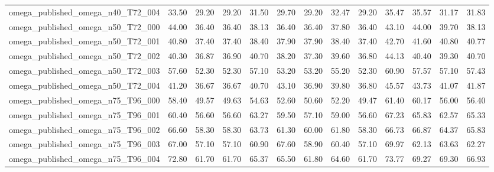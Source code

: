 \begin{table}[htbp]
\begin{tabular}{lrrrrrrrrrrrr}
omega\_published\_omega\_n40\_T72\_004 & 33.50 & 29.20 & 29.20 & 31.50 & 29.70 & 29.20 & 32.47 & 29.20 & 35.47 & 35.57 & 31.17 & 31.83 \\
omega\_published\_omega\_n50\_T72\_000 & 44.00 & 36.40 & 36.40 & 38.13 & 36.40 & 36.40 & 37.80 & 36.40 & 43.10 & 44.00 & 39.70 & 38.13 \\
omega\_published\_omega\_n50\_T72\_001 & 40.80 & 37.40 & 37.40 & 38.40 & 37.90 & 37.90 & 38.40 & 37.40 & 42.70 & 41.60 & 40.80 & 40.77 \\
omega\_published\_omega\_n50\_T72\_002 & 40.30 & 36.87 & 36.90 & 40.70 & 38.20 & 37.30 & 39.60 & 36.80 & 44.13 & 40.40 & 39.30 & 40.70 \\
omega\_published\_omega\_n50\_T72\_003 & 57.60 & 52.30 & 52.30 & 57.10 & 53.20 & 53.20 & 55.20 & 52.30 & 60.90 & 57.57 & 57.10 & 57.43 \\
omega\_published\_omega\_n50\_T72\_004 & 41.20 & 36.67 & 36.67 & 40.70 & 43.10 & 36.90 & 39.80 & 36.80 & 45.57 & 43.73 & 41.07 & 41.87 \\
omega\_published\_omega\_n75\_T96\_000 & 58.40 & 49.57 & 49.63 & 54.63 & 52.60 & 50.60 & 52.20 & 49.47 & 61.40 & 60.17 & 56.00 & 56.40 \\
omega\_published\_omega\_n75\_T96\_001 & 60.40 & 56.60 & 56.60 & 63.27 & 59.50 & 57.10 & 59.00 & 56.60 & 67.23 & 65.83 & 62.57 & 65.33 \\
omega\_published\_omega\_n75\_T96\_002 & 66.60 & 58.30 & 58.30 & 63.73 & 61.30 & 60.00 & 61.80 & 58.30 & 66.73 & 66.87 & 64.37 & 65.83 \\
omega\_published\_omega\_n75\_T96\_003 & 67.00 & 57.10 & 57.10 & 60.90 & 67.60 & 58.90 & 60.40 & 57.10 & 69.97 & 62.13 & 63.63 & 62.27 \\
omega\_published\_omega\_n75\_T96\_004 & 72.80 & 61.70 & 61.70 & 65.37 & 65.50 & 61.80 & 64.60 & 61.70 & 73.77 & 69.27 & 69.30 & 66.93 \\
\bottomrule
\end{tabular}
\end{table}
